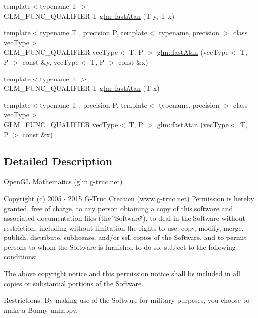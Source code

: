 \begin{DoxyCompactItemize}
\item 
{\footnotesize template$<$typename T $>$ }\\G\+L\+M\+\_\+\+F\+U\+N\+C\+\_\+\+Q\+U\+A\+L\+I\+F\+I\+E\+R T \hyperlink{group__gtx__fast__trigonometry_ga8d197c6ef564f5e5d59af3b3f8adcc2c}{glm\+::fast\+Atan} (T y, T x)
\item 
{\footnotesize template$<$typename T , precision P, template$<$ typename, precision $>$ class vec\+Type$>$ }\\G\+L\+M\+\_\+\+F\+U\+N\+C\+\_\+\+Q\+U\+A\+L\+I\+F\+I\+E\+R vec\+Type$<$ T, P $>$ \hyperlink{namespaceglm_ae44077649af44bfe95fab2d4576c5dbe}{glm\+::fast\+Atan} (vec\+Type$<$ T, P $>$ const \&y, vec\+Type$<$ T, P $>$ const \&x)
\item 
{\footnotesize template$<$typename T $>$ }\\G\+L\+M\+\_\+\+F\+U\+N\+C\+\_\+\+Q\+U\+A\+L\+I\+F\+I\+E\+R T \hyperlink{group__gtx__fast__trigonometry_gae25de86a968490ff56856fa425ec9d30}{glm\+::fast\+Atan} (T x)
\item 
{\footnotesize template$<$typename T , precision P, template$<$ typename, precision $>$ class vec\+Type$>$ }\\G\+L\+M\+\_\+\+F\+U\+N\+C\+\_\+\+Q\+U\+A\+L\+I\+F\+I\+E\+R vec\+Type$<$ T, P $>$ \hyperlink{namespaceglm_a89520a2015e9c9f5b1a202e7e4dcc7ea}{glm\+::fast\+Atan} (vec\+Type$<$ T, P $>$ const \&x)
\end{DoxyCompactItemize}


\subsection{Detailed Description}
Open\+G\+L Mathematics (glm.\+g-\/truc.\+net)

Copyright (c) 2005 -\/ 2015 G-\/\+Truc Creation (www.\+g-\/truc.\+net) Permission is hereby granted, free of charge, to any person obtaining a copy of this software and associated documentation files (the \char`\"{}\+Software\char`\"{}), to deal in the Software without restriction, including without limitation the rights to use, copy, modify, merge, publish, distribute, sublicense, and/or sell copies of the Software, and to permit persons to whom the Software is furnished to do so, subject to the following conditions\+:

The above copyright notice and this permission notice shall be included in all copies or substantial portions of the Software.

Restrictions\+: By making use of the Software for military purposes, you choose to make a Bunny unhappy.

